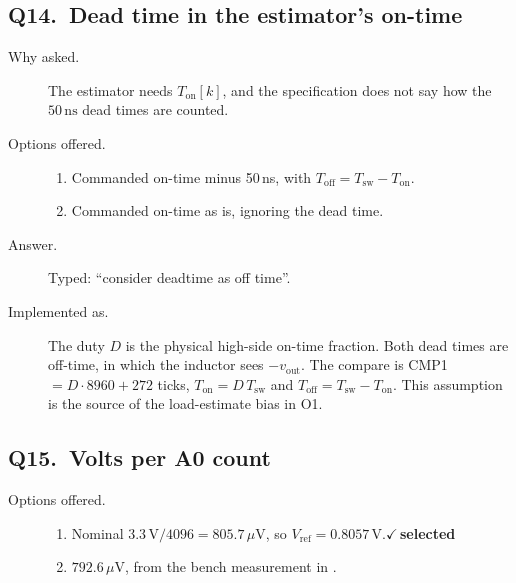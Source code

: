 \documentclass[11pt]{article}
\newcommand{\code}[1]{\texttt{\detokenize{#1}}}
\newcommand{\chosen}{\hfill$\checkmark$\,\textbf{selected}}
\begin{document}
\subsection*{Q14.\ Dead time in the estimator's on-time}
\begin{description}
\item[Why asked.] The estimator needs $T_{\mathrm{on}}[k]$, and the
specification does not say how the $50\,\mathrm{ns}$ dead times are
counted.
\item[Options offered.]\leavevmode
  \begin{enumerate}
  \item Commanded on-time minus 50\,ns, with
        $T_{\mathrm{off}}=T_{\mathrm{sw}}-T_{\mathrm{on}}$.
  \item Commanded on-time as is, ignoring the dead time.
  \end{enumerate}
\item[Answer.] Typed: ``consider deadtime as off time''.
\item[Implemented as.] The duty $D$ is the physical high-side on-time
fraction. Both dead times are off-time, in which the inductor sees
$-v_{\mathrm{out}}$. The compare is CMP1 $=D\cdot 8960+272$ ticks,
$T_{\mathrm{on}}=D\,T_{\mathrm{sw}}$ and
$T_{\mathrm{off}}=T_{\mathrm{sw}}-T_{\mathrm{on}}$. This assumption is
the source of the load-estimate bias in O1.
\end{description}

\subsection*{Q15.\ Volts per A0 count}
\begin{description}
\item[Options offered.]\leavevmode
  \begin{enumerate}
  \item Nominal $3.3\,\mathrm{V}/4096=805.7\,\mu\mathrm{V}$, so
        $V_{\mathrm{ref}}=0.8057\,\mathrm{V}$.\chosen
  \item $792.6\,\mu\mathrm{V}$, from the bench measurement in
        \code{Buck_Voltage_Mode}.
  \end{enumerate}
\end{description}
\end{document}
